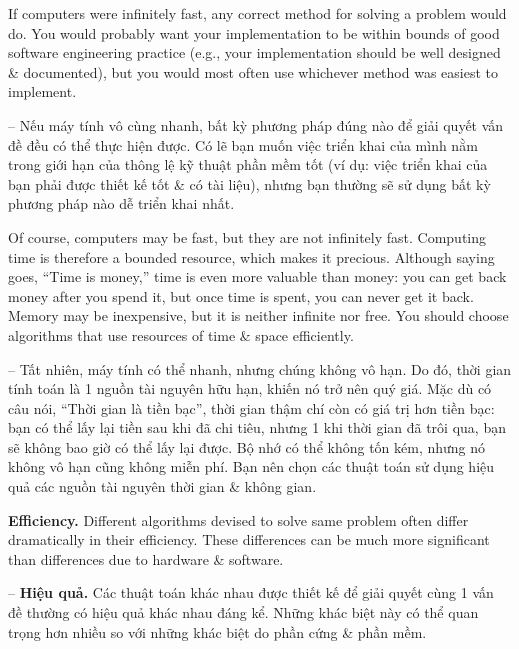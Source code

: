 \documentclass{article}
\begin{document}
\begin{itemize}
\begin{itemize}
\begin{itemize}
            If computers were infinitely fast, any correct method for solving a problem would do. You would probably want your implementation to be within bounds of good software engineering practice (e.g., your implementation should be well designed \& documented), but you would most often use whichever method was easiest to implement.
            
            -- Nếu máy tính vô cùng nhanh, bất kỳ phương pháp đúng nào để giải quyết vấn đề đều có thể thực hiện được. Có lẽ bạn muốn việc triển khai của mình nằm trong giới hạn của thông lệ kỹ thuật phần mềm tốt (ví dụ: việc triển khai của bạn phải được thiết kế tốt \& có tài liệu), nhưng bạn thường sẽ sử dụng bất kỳ phương pháp nào dễ triển khai nhất.
            
            Of course, computers may be fast, but they are not infinitely fast. Computing time is therefore a bounded resource, which makes it precious. Although saying goes, ``Time is money,'' time is even more valuable than money: you can get back money after you spend it, but once time is spent, you can never get it back. Memory may be inexpensive, but it is neither infinite nor free. You should choose algorithms that use resources of time \& space efficiently.
            
            -- Tất nhiên, máy tính có thể nhanh, nhưng chúng không vô hạn. Do đó, thời gian tính toán là 1 nguồn tài nguyên hữu hạn, khiến nó trở nên quý giá. Mặc dù có câu nói, ``Thời gian là tiền bạc'', thời gian thậm chí còn có giá trị hơn tiền bạc: bạn có thể lấy lại tiền sau khi đã chi tiêu, nhưng 1 khi thời gian đã trôi qua, bạn sẽ không bao giờ có thể lấy lại được. Bộ nhớ có thể không tốn kém, nhưng nó không vô hạn cũng không miễn phí. Bạn nên chọn các thuật toán sử dụng hiệu quả các nguồn tài nguyên thời gian \& không gian.
            
            {\bf Efficiency.} Different algorithms devised to solve same problem often differ dramatically in their efficiency. These differences can be much more significant than differences due to hardware \& software.
            
            -- {\bf Hiệu quả.} Các thuật toán khác nhau được thiết kế để giải quyết cùng 1 vấn đề thường có hiệu quả khác nhau đáng kể. Những khác biệt này có thể quan trọng hơn nhiều so với những khác biệt do phần cứng \& phần mềm.
            

\end{itemize}
\end{itemize}
\end{itemize}
\end{document}
